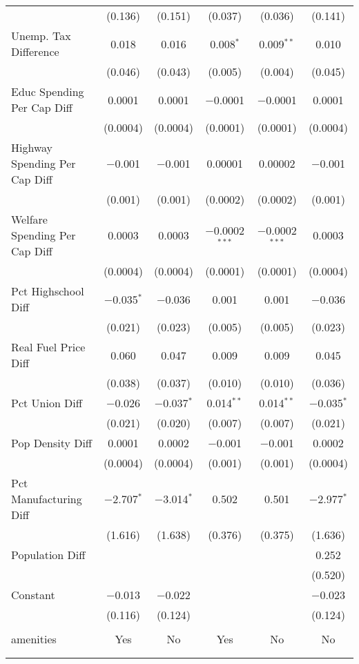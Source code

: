 \begin{table}[!htbp]
\begin{tabular}{@{\extracolsep{5pt}}lccccc}
  & (0.136) & (0.151) & (0.037) & (0.036) & (0.141) \\ 
  Unemp. Tax Difference & 0.018 & 0.016 & 0.008$^{*}$ & 0.009$^{**}$ & 0.010 \\ 
  & (0.046) & (0.043) & (0.005) & (0.004) & (0.045) \\ 
  Educ Spending Per Cap Diff & 0.0001 & 0.0001 & $-$0.0001 & $-$0.0001 & 0.0001 \\ 
  & (0.0004) & (0.0004) & (0.0001) & (0.0001) & (0.0004) \\ 
  Highway Spending Per Cap Diff & $-$0.001 & $-$0.001 & 0.00001 & 0.00002 & $-$0.001 \\ 
  & (0.001) & (0.001) & (0.0002) & (0.0002) & (0.001) \\ 
  Welfare Spending Per Cap Diff & 0.0003 & 0.0003 & $-$0.0002$^{***}$ & $-$0.0002$^{***}$ & 0.0003 \\ 
  & (0.0004) & (0.0004) & (0.0001) & (0.0001) & (0.0004) \\ 
  Pct Highschool Diff & $-$0.035$^{*}$ & $-$0.036 & 0.001 & 0.001 & $-$0.036 \\ 
  & (0.021) & (0.023) & (0.005) & (0.005) & (0.023) \\ 
  Real Fuel Price Diff & 0.060 & 0.047 & 0.009 & 0.009 & 0.045 \\ 
  & (0.038) & (0.037) & (0.010) & (0.010) & (0.036) \\ 
  Pct Union Diff & $-$0.026 & $-$0.037$^{*}$ & 0.014$^{**}$ & 0.014$^{**}$ & $-$0.035$^{*}$ \\ 
  & (0.021) & (0.020) & (0.007) & (0.007) & (0.021) \\ 
  Pop Density Diff & 0.0001 & 0.0002 & $-$0.001 & $-$0.001 & 0.0002 \\ 
  & (0.0004) & (0.0004) & (0.001) & (0.001) & (0.0004) \\ 
  Pct Manufacturing Diff & $-$2.707$^{*}$ & $-$3.014$^{*}$ & 0.502 & 0.501 & $-$2.977$^{*}$ \\ 
  & (1.616) & (1.638) & (0.376) & (0.375) & (1.636) \\ 
  Population Diff &  &  &  &  & 0.252 \\ 
  &  &  &  &  & (0.520) \\ 
  Constant & $-$0.013 & $-$0.022 &  &  & $-$0.023 \\ 
  & (0.116) & (0.124) &  &  & (0.124) \\ 
 \hline \\[-1.8ex] 
amenities & Yes & No & Yes & No & No \\ 
\hline \\[-1.8ex] 
\hline 
\hline \\[-1.8ex] 
\end{tabular} 
\end{table} 
